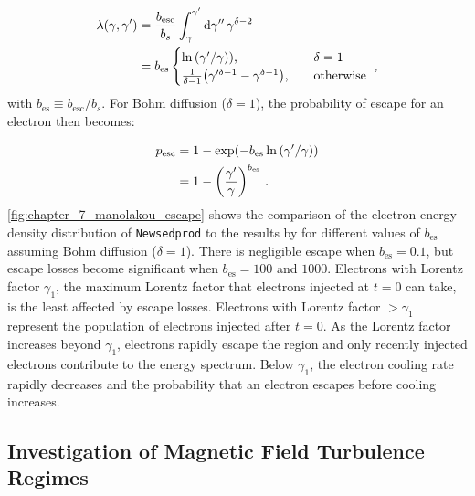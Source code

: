 \begin{equation}
    \begin{aligned}
   	 \lambda\qty(\gamma,\gamma')&=\frac{b_\text{esc}}{b_s}\int_\gamma^{\gamma'}\dd{\gamma''}\gamma^{\delta-2} \\
  	  &=b_\text{es}
  	  \begin{cases}
  		  \ln\qty({\gamma'}/{\gamma}))\text{,}\quad &\delta =1 \\
  		  \frac{1}{\delta-1}\qty(\gamma'^{\delta-1}-\gamma^{\delta -1})\text{,}\quad&\text{otherwise}
    	\end{cases}\text{ ,}
    \end{aligned} \label{eq:chapter_7_lambda_plus_diffusion}
\end{equation}
\noindent with $b_\text{es}\equiv b_\text{esc}/b_s$. For Bohm diffusion ($\delta=1$), the probability of escape for an electron then becomes:

\begin{equation}
    \begin{aligned}
    p_\text{esc}&=1-\exp(-b_\text{es}\ln\qty(\gamma'/\gamma)) \\
    &=1-\qty(\frac{\gamma'}{\gamma})^{b_\text{es}}\text{ .}
    \end{aligned}
\end{equation}
\newpar
\autoref{fig:chapter_7_manolakou_escape} shows the comparison of the electron energy density distribution of {\tt Newsedprod} to the results  by \cite{2007A&A...474..689M} for different values of $b_\text{es}$ assuming Bohm diffusion ($\delta=1$). There is negligible escape when $b_\text{es}=0.1$, but escape losses become significant when $b_\text{es}=100$ and $1000$. Electrons with Lorentz factor $\gamma_1$, the maximum Lorentz factor that electrons injected at $t=0$ can take, is the least affected by escape losses. Electrons with Lorentz factor $>\gamma_1$ represent the population of electrons injected after $t=0$. As the Lorentz factor increases beyond $\gamma_1$, electrons rapidly escape the region and only recently injected electrons contribute to the energy spectrum. Below $\gamma_1$, the electron cooling rate rapidly decreases and the probability that an electron escapes before cooling increases. 

\subsection{Investigation of Magnetic Field Turbulence Regimes}

